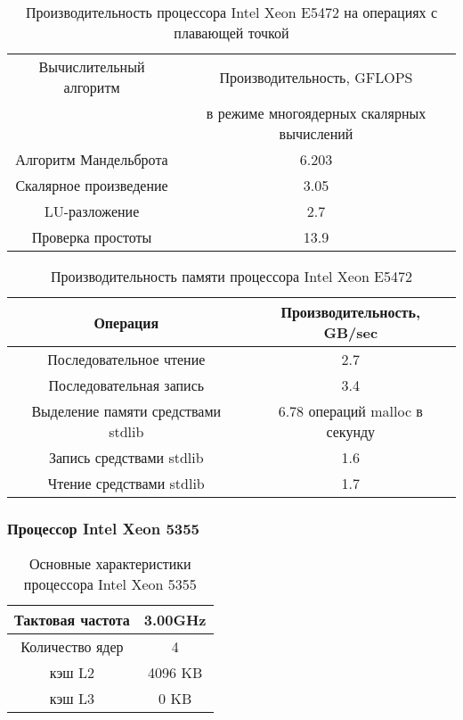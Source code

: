 \begin{table}[ht]
	\begin{center}
		\caption{Производительность процессора Intel Xeon  E5472 на операциях с плавающей точкой}
		\begin{tabular}{|c|c|}
			\hline	
			Вычислительный алгоритм &  Производительность, GFLOPS \\ 
			& в режиме многоядерных скалярных вычислений \\ \hline
			Алгоритм Мандельброта  &  6.203 	\\ \hline
			Скалярное произведение &  3.05   \\ \hline
			LU-разложение          &  2.7   \\ \hline
			Проверка простоты      &  13.9  \\ \hline 
			
			
		\end{tabular}
	\end{center} 	
\end{table} 	

\begin{table}[ht]
	\begin{center}
		\caption{Производительность памяти процессора Intel Xeon E5472}
		\begin{tabular}{|c|c|}
			\hline	
			Операция  &  Производительность, GB/sec \\ \hline
			Последовательное чтение &  2.7 	\\  \hline
			Последовательная запись &  3.4   \\  \hline
			Выделение памяти средствами stdlib &  6.78 операций malloc в секунду  \\  \hline
			Запись средствами stdlib  & 1.6  \\ \hline
			Чтение средствами stdlib  & 1.7  \\ \hline 
		\end{tabular}
	\end{center} 	
\end{table} 	

\clearpage

\subsubsection{Процессор Intel Xeon 5355}

\begin{table}[ht]
	\begin{center}
		\caption{Основные характеристики процессора Intel Xeon  5355}
		\begin{tabular}{|c|c|}
			\hline	
			Тактовая частота & 3.00GHz   \\ \hline
			Количество ядер & 4 	     \\ \hline
			кэш L2         &  4096 KB      \\ \hline
			кэш L3         &  0 KB        \\ \hline
		\end{tabular}
	\end{center} 	
\end{table} 	

